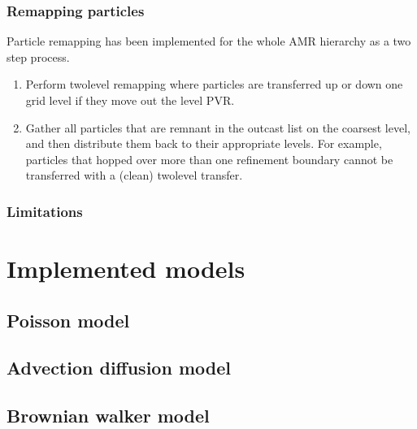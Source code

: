 \documentclass[letterpaper,10pt,english]{sphinxmanual}
\begin{document}
\subsection{Remapping particles}
\label{\detokenize{Ito:remapping-particles}}
Particle remapping has been implemented for the whole AMR hierarchy as a two step process.
\begin{enumerate}
%
\item {} 
Perform two\sphinxhyphen{}level remapping where particles are transferred up or down one grid level if they move out the level PVR.

\item {} 
Gather all particles that are remnant in the outcast list on the coarsest level, and then distribute them back to their appropriate levels. For example, particles that hopped over more than one refinement boundary cannot be transferred with a (clean) two\sphinxhyphen{}level transfer.

\end{enumerate}


\subsection{Limitations}
\label{\detokenize{Ito:limitations}}

\chapter{Implemented models}
\label{\detokenize{index:implemented-models}}\label{\detokenize{index:chap-implementedmodels}}

\section{Poisson model}
\label{\detokenize{PoissonModel:poisson-model}}\label{\detokenize{PoissonModel:chap-poissonmodel}}\label{\detokenize{PoissonModel::doc}}

\section{Advection diffusion model}
\label{\detokenize{AdvectionDiffusionModel:advection-diffusion-model}}\label{\detokenize{AdvectionDiffusionModel:chap-advectiondiffusionmodel}}\label{\detokenize{AdvectionDiffusionModel::doc}}

\section{Brownian walker model}
\label{\detokenize{BrownianWalkerModel:brownian-walker-model}}\label{\detokenize{BrownianWalkerModel:chap-brownianwalkermodel}}\label{\detokenize{BrownianWalkerModel::doc}}
\end{document}
